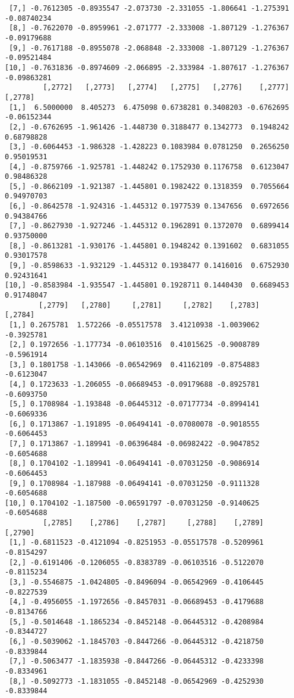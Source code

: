 \documentclass[
  letterpaper,
  DIV=11,
  numbers=noendperiod]{scrreprt}
\begin{document}
\begin{verbatim}
 [7,] -0.7612305 -0.8935547 -2.073730 -2.331055 -1.806641 -1.275391 -0.08740234
 [8,] -0.7622070 -0.8959961 -2.071777 -2.333008 -1.807129 -1.276367 -0.09179688
 [9,] -0.7617188 -0.8955078 -2.068848 -2.333008 -1.807129 -1.276367 -0.09521484
[10,] -0.7631836 -0.8974609 -2.066895 -2.333984 -1.807617 -1.276367 -0.09863281
         [,2772]   [,2773]   [,2774]   [,2775]   [,2776]    [,2777]     [,2778]
 [1,]  6.5000000  8.405273  6.475098 0.6738281 0.3408203 -0.6762695 -0.06152344
 [2,] -0.6762695 -1.961426 -1.448730 0.3188477 0.1342773  0.1948242  0.68798828
 [3,] -0.6064453 -1.986328 -1.428223 0.1083984 0.0781250  0.2656250  0.95019531
 [4,] -0.8759766 -1.925781 -1.448242 0.1752930 0.1176758  0.6123047  0.98486328
 [5,] -0.8662109 -1.921387 -1.445801 0.1982422 0.1318359  0.7055664  0.94970703
 [6,] -0.8642578 -1.924316 -1.445312 0.1977539 0.1347656  0.6972656  0.94384766
 [7,] -0.8627930 -1.927246 -1.445312 0.1962891 0.1372070  0.6899414  0.93750000
 [8,] -0.8613281 -1.930176 -1.445801 0.1948242 0.1391602  0.6831055  0.93017578
 [9,] -0.8598633 -1.932129 -1.445312 0.1938477 0.1416016  0.6752930  0.92431641
[10,] -0.8583984 -1.935547 -1.445801 0.1928711 0.1440430  0.6689453  0.91748047
        [,2779]   [,2780]     [,2781]     [,2782]    [,2783]    [,2784]
 [1,] 0.2675781  1.572266 -0.05517578  3.41210938 -1.0039062 -0.3925781
 [2,] 0.1972656 -1.177734 -0.06103516  0.41015625 -0.9008789 -0.5961914
 [3,] 0.1801758 -1.143066 -0.06542969  0.41162109 -0.8754883 -0.6123047
 [4,] 0.1723633 -1.206055 -0.06689453 -0.09179688 -0.8925781 -0.6093750
 [5,] 0.1708984 -1.193848 -0.06445312 -0.07177734 -0.8994141 -0.6069336
 [6,] 0.1713867 -1.191895 -0.06494141 -0.07080078 -0.9018555 -0.6064453
 [7,] 0.1713867 -1.189941 -0.06396484 -0.06982422 -0.9047852 -0.6054688
 [8,] 0.1704102 -1.189941 -0.06494141 -0.07031250 -0.9086914 -0.6064453
 [9,] 0.1708984 -1.187988 -0.06494141 -0.07031250 -0.9111328 -0.6054688
[10,] 0.1704102 -1.187500 -0.06591797 -0.07031250 -0.9140625 -0.6054688
         [,2785]    [,2786]    [,2787]     [,2788]    [,2789]    [,2790]
 [1,] -0.6811523 -0.4121094 -0.8251953 -0.05517578 -0.5209961 -0.8154297
 [2,] -0.6191406 -0.1206055 -0.8383789 -0.06103516 -0.5122070 -0.8115234
 [3,] -0.5546875 -1.0424805 -0.8496094 -0.06542969 -0.4106445 -0.8227539
 [4,] -0.4956055 -1.1972656 -0.8457031 -0.06689453 -0.4179688 -0.8134766
 [5,] -0.5014648 -1.1865234 -0.8452148 -0.06445312 -0.4208984 -0.8344727
 [6,] -0.5039062 -1.1845703 -0.8447266 -0.06445312 -0.4218750 -0.8339844
 [7,] -0.5063477 -1.1835938 -0.8447266 -0.06445312 -0.4233398 -0.8334961
 [8,] -0.5092773 -1.1831055 -0.8452148 -0.06542969 -0.4252930 -0.8339844

\end{verbatim}
\end{document}
